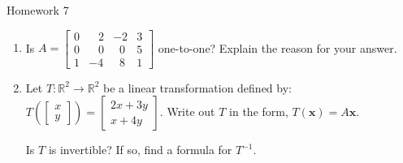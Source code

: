 \documentclass[10pt, aspectratio=169]{beamer}
\begin{document}
\begin{frame}{Homework 7}
\begin{enumerate}
    \item Is \(A = \begin{bmatrix}
        0 & \;\;\;2 & -2 & 3\\
        0 & \;\;\;0 & \;\;0 & 5\\
        1 & -4 & \;\; 8 & 1
    \end{bmatrix}\) one-to-one? Explain the reason for your answer.
    \item Let \( T: \mathbb{R}^2 \to \mathbb{R}^2 \) be a linear transformation defined by:
    \(
    T\left(\left[\begin{array}{c} x \\y \end{array}\right]\right) = 
    \left[\begin{array}{c} 2x + 3y\\ x + 4y \end{array}\right].
    \)
    Write out \(T\) in the form, \(T(\mathbf{x}) = A\mathbf{x}.\)
    
    Is \(T\) is invertible? If so, find a formula for \(T^{-1}.\)
\end{enumerate}
\end{frame}
\end{document}
